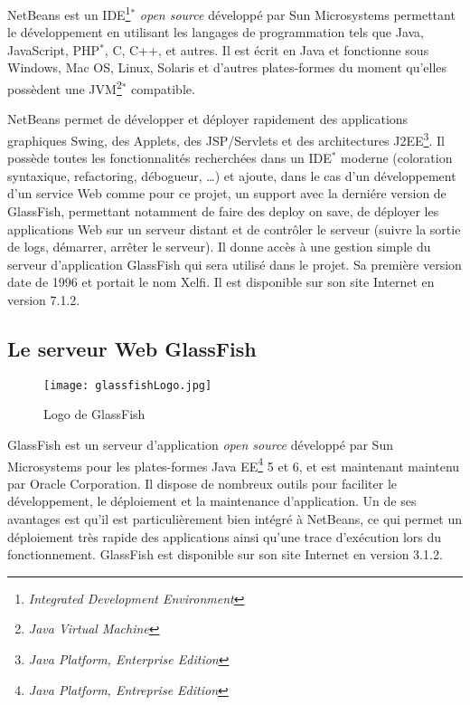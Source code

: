 NetBeans est un IDE\protect\footnote{\textit{Integrated Development Environment}}$^*$ \textit{open source} d\'evelopp\'e par Sun Microsystems permettant le d\'eveloppement en utilisant les langages de programmation tels que Java, JavaScript, PHP$^*$, C, C++, et autres.
Il est \'ecrit en Java et fonctionne sous Windows, Mac OS, Linux, Solaris et d'autres plates-formes du moment qu'elles poss\`edent une JVM\protect\footnote{\textit{Java Virtual Machine}}$^*$ compatible.

NetBeans permet de d\'evelopper et d\'eployer rapidement des applications graphiques Swing, des Applets, des JSP/Servlets et des architectures J2EE\protect\footnote{\textit{Java Platform, Enterprise Edition}}.
Il poss\`ede toutes les fonctionnalit\'es recherch\'ees dans un IDE$^*$ moderne (coloration syntaxique, refactoring, d\'ebogueur, \ldots) et ajoute, dans le cas d'un d\'eveloppement d'un service Web comme pour ce projet, un support avec la derni\'ere version de GlassFish, permettant notamment de faire des \og{}deploy on save\fg{}, de d\'eployer les applications Web sur un serveur distant et de contr\^oler le serveur (suivre la sortie de logs, d\'emarrer, arr\^eter le serveur). 
Il donne acc\`es \`a une gestion simple du serveur d'application GlassFish qui sera utilis\'e dans le projet.
Sa premi\`ere version date de 1996 et portait le nom Xelfi. 
Il est disponible sur son site Internet\cite{biblio:siteNetbeans} en version 7.1.2.

\subsection{Le serveur Web GlassFish}
\label{section:glassfish}

\begin{figure}[!ht]
	\centering
	\texttt{[image: glassfishLogo.jpg]}
	\caption{Logo de GlassFish}

\end{figure}

GlassFish est un serveur d'application \textit{open source} d\'evelopp\'e par Sun Microsystems pour les plates-formes Java EE\protect\footnote{\textit{Java Platform, Entreprise Edition}} 5 et 6, et est maintenant maintenu par Oracle Corporation.
Il dispose de nombreux outils pour faciliter le d\'eveloppement, le d\'eploiement et la maintenance d'application.
Un de ses avantages est qu'il est particuli\`erement bien int\'egr\'e \`a NetBeans, ce qui permet un d\'eploiement tr\`es rapide des applications ainsi qu'une trace d'ex\'ecution lors du fonctionnement.
GlassFish est disponible sur son site Internet\cite{biblio:siteGlassfish} en version 3.1.2.

